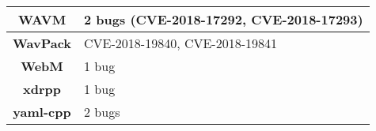 \begin{table}[h]
\begin{tabular}{|c|l|}
\textbf{WAVM}           & 2 bugs (CVE-2018-17292, CVE-2018-17293)                                                                                                                                                            \\ \hline
\textbf{WavPack}        & CVE-2018-19840, CVE-2018-19841                                                                                                                                                                     \\ \hline
\textbf{WebM}           & 1 bug                                                                                                                                                                                              \\ \hline
\textbf{xdrpp}          & 1 bug                                                                                                                                                                                              \\ \hline
\textbf{yaml-cpp}       & 2 bugs                                                                                                                                                                                             \\ \hline
\end{tabular}
\end{table}